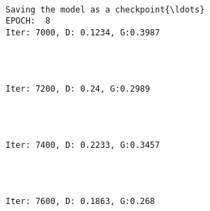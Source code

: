 \documentclass[11pt]{article}
\begin{document}
    \begin{Verbatim}[commandchars=\\\{\}]

Saving the model as a checkpoint{\ldots}
EPOCH:  8
Iter: 7000, D: 0.1234, G:0.3987
    \end{Verbatim}

    \begin{center}
    \end{center}
    { \hspace*{\fill} \\}
    
    \begin{Verbatim}[commandchars=\\\{\}]

Iter: 7200, D: 0.24, G:0.2989
    \end{Verbatim}

    \begin{center}
    \end{center}
    { \hspace*{\fill} \\}
    
    \begin{Verbatim}[commandchars=\\\{\}]

Iter: 7400, D: 0.2233, G:0.3457
    \end{Verbatim}

    \begin{center}
    \end{center}
    { \hspace*{\fill} \\}
    
    \begin{Verbatim}[commandchars=\\\{\}]

Iter: 7600, D: 0.1863, G:0.268
    \end{Verbatim}

    \begin{center}
    \end{center}
    { \hspace*{\fill} \\}
    
\end{document}
